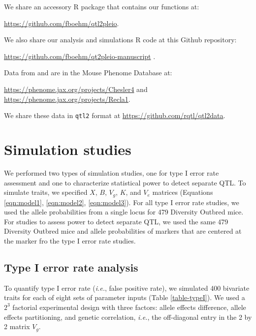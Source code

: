 \documentclass[12pt,twoside, lineno]{gsajnl}
\begin{document}
We share an accessory R package that contains our functions at:

\href{https://github.com/fboehm/qtl2pleio}{https://github.com/fboehm/qtl2pleio}.

\noindent We also share our analysis and simulations R code at this Github repository:

\href{https://github.com/fboehm/qt2pleio-manuscript}{https://github.com/fboehm/qt2pleio-manuscript} \citep{r}.

\noindent Data from \citet{recla2014precise} and \citet{logan2013high} are in the Mouse Phenome Database at:

\href{https://phenome.jax.org/projects/Chesler4}{https://phenome.jax.org/projects/Chesler4} and \href{https://phenome.jax.org/projects/Recla1}{https://phenome.jax.org/projects/Recla1}.

\noindent We share these data in \texttt{qtl2} format at \href{https://github.com/rqtl/qtl2data}{https://github.com/rqtl/qtl2data}.




\section{Simulation studies}

We performed two types of simulation studies, one for type I error
rate assessment and one to characterize statistical power to detect
separate QTL. To simulate traits, we specified $X$, $B$, $V_g$, $K$,
and $V_e$ matrices (Equations \ref{eqn:model1}, \ref{eqn:model2},
\ref{eqn:model3}). For all type I error rate studies, we used the
allele probabilities from a single locus for 479 Diversity Outbred
mice. For studies to assess power to detect separate QTL, we used the
same 479 Diversity Outbred mice and allele probabilities of markers
that are centered at the marker fro the type I error rate studies.

\subsection{Type I error rate analysis}

To quantify type I error rate ({\em i.e.}, false positive rate), we
simulated 400 bivariate traits for each of eight sets of parameter
inputs (Table \ref{table-typeI}). We used a $2^3$ factorial
experimental design with three factors: allele effects difference,
allele effects partitioning, and genetic correlation, \textit{i.e.},
the off-diagonal entry in the 2 by 2 matrix $V_g$.
\end{document}
